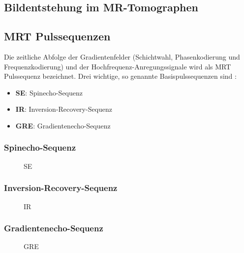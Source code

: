\subsection{Bildentstehung im MR-Tomographen}

\subsection{MRT Pulssequenzen}
Die zeitliche Abfolge der Gradientenfelder (Schichtwahl, Phasenkodierung und Frequenzkodierung) und der Hochfrequenz-Anregungssignale wird als MRT Pulssequenz bezeichnet.
Drei wichtige, so genannte Basispulssequenzen sind \cite[S. 999]{Weishaupt2014}:
\begin{itemize}
	\item \textbf{SE}: Spinecho-Sequenz
	\item \textbf{IR}: Inversion-Recovery-Sequenz
	\item \textbf{GRE}: Gradientenecho-Sequenz
\end{itemize}


\subsubsection{Spinecho-Sequenz}

\begin{figure}[H]
	\centering
	\caption[SpinEcho Sequenz]{SE}
	\label{fig:SE}
\end{figure}

\subsubsection{Inversion-Recovery-Sequenz}

\begin{figure}[H]
	\centering
	\caption[SpinEcho Sequenz]{IR}
	\label{fig:IR}
\end{figure}

\subsubsection{Gradientenecho-Sequenz}

\begin{figure}[H]
	\centering
	\caption[Inversion Recovery Sequenz]{GRE}
	\label{fig:GRE}
\end{figure}

